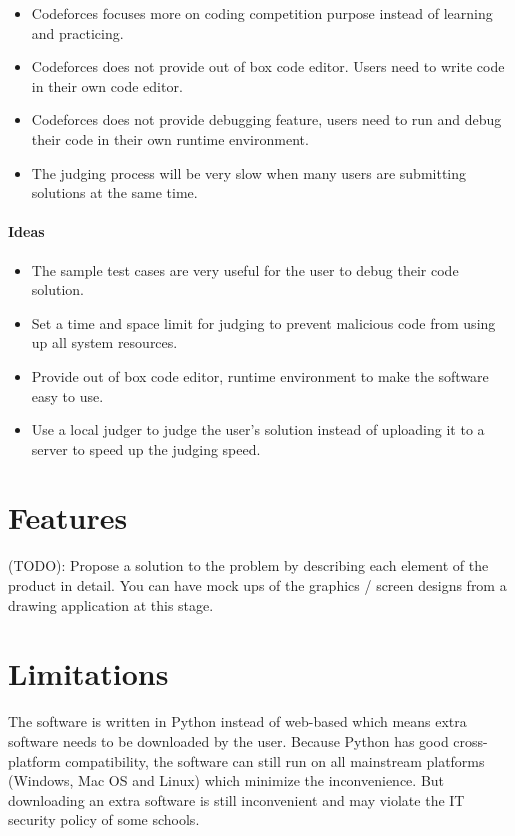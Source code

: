 \documentclass[a4paper]{report}
\begin{document}
\begin{itemize}
    \item Codeforces focuses more on coding competition purpose instead of learning and practicing.
    \item Codeforces does not provide out of box code editor. Users need to write code in their own code editor.
    \item Codeforces does not provide debugging feature, users need to run and debug their code in their own runtime environment.
    \item The judging process will be very slow when many users are submitting solutions at the same time.
\end{itemize}

\paragraph{Ideas}

\begin{itemize}
    \item The sample test cases are very useful for the user to debug their code solution.
    \item Set a time and space limit for judging to prevent malicious code from using up all system resources.
    \item Provide out of box code editor, runtime environment to make the software easy to use.
    \item Use a local judger to judge the user's solution instead of uploading it to a server to speed up the judging speed. 
\end{itemize}

\section{Features}

(TODO): Propose a solution to the problem by describing each element of the product in detail.  You can have mock ups of the graphics / screen designs from a drawing application at this stage.

\section{Limitations}

The software is written in Python instead of web-based which means extra software needs to be downloaded by the user. Because Python has good cross-platform compatibility, the software can still run on all mainstream platforms (Windows, Mac OS and Linux) which minimize the inconvenience. But downloading an extra software is still inconvenient and may violate the IT security policy of some schools.
\end{document}
